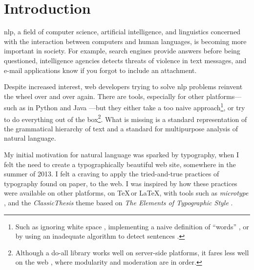 
\begingroup
\let\clearpage\relax
\let\cleardoublepage\relax
\let\cleardoublepage\relax

\chapter*{Introduction}

\Gls{nlp}, a field of computer science, artificial intelligence, and
  linguistics concerned with the interaction between computers and human
  languages, is becoming more important in society.
For example, search engines provide answers before being questioned,
  intelligence agencies detects threats of violence in text messages, and
  e-mail applications know if you forgot to include an attachment.

Despite increased interest, web developers trying to solve \gls{nlp} problems
reinvent the wheel over and over again. There are tools,
especially for other platforms---such as in Python
\autocite{nltk-source} and Java \autocite{opennlp-source}---but they either
take a too naive approach\footnote{Such as ignoring white space
  \autocite{loadfive/knwl-source-code}, implementing a naive
  definition of ``words'' \autocite{nhunzaker/speakeasy-source-code},
  or by using an inadequate algorithm to detect sentences
  \autocite[][]{nytimes/emphasis-source-code}.}, or try to do everything out
of the box\footnote{Although a do-all library works well on server-side
  platforms, it fares less well on the web \autocite[such
  as][]{NaturalNode/natural-source-code}, where modularity and moderation
  are in order.}. What is missing is a standard representation of the
grammatical hierarchy of text and a standard for multipurpose analysis of
natural language.

My initial motivation for natural language was sparked by typography, when I
  felt the need to create a typographically beautiful web site, somewhere in
  the summer of 2013.
I felt a craving to apply the tried-and-true practices of typography found on
  paper, to the web.
I was inspired by how these practices were available on other platforms,
  on \TeX\,or \LaTeX, with tools such as \emph{microtype} \autocite{microtype},
  and the \emph{ClassicThesis} theme \autocite{classicthesis} based on
  \emph{The Elements of Typographic Style}
  \autocite{bringhurst-element-typographic-style}.

